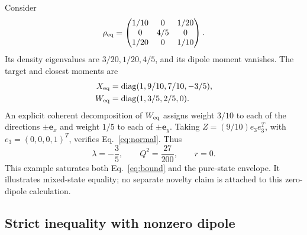 \documentclass[aps,pra,reprint,amsmath,amssymb,superscriptaddress,longbibliography]{revtex4-2}
\newcommand{\diag}{\operatorname{diag}}
\begin{document}
Consider
\begin{equation}
 \rho_{\rm eq}=
 \begin{pmatrix}
  1/10&0&1/20\\
  0&4/5&0\\
  1/20&0&1/10
 \end{pmatrix}.
 \label{eq:rhoeq}
\end{equation}
Its density eigenvalues are \(3/20,1/20,4/5\), and its dipole moment vanishes. The target and closest moments are
\begin{align}
 X_{\rm eq}&=\diag(1,9/10,7/10,-3/5),\nonumber\\
 W_{\rm eq}&=\diag(1,3/5,2/5,0).
\end{align}
An explicit coherent decomposition of \(W_{\rm eq}\) assigns weight \(3/10\) to each of the directions \(\pm\bm e_x\) and weight \(1/5\) to each of \(\pm\bm e_y\). Taking \(Z=(9/10)e_3e_3^T\), with \(e_3=(0,0,0,1)^T\), verifies Eq.~\eqref{eq:normal}. Thus
\begin{equation}
 \lambda=-\frac35,\qquad Q^2=\frac{27}{200},\qquad r=0.
\end{equation}
This example saturates both Eq.~\eqref{eq:bound} and the pure-state envelope. It illustrates mixed-state equality; no separate novelty claim is attached to this zero-dipole calculation.

\subsection{Strict inequality with nonzero dipole}
\end{document}
